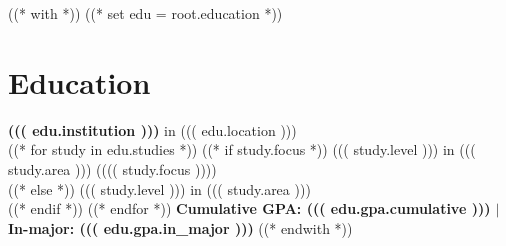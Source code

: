 ((* with *))
((* set edu = root.education *))
\section{Education}\relax
    \noindent\textbf{((( edu.institution )))} \small{in ((( edu.location )))}\\
((* for study in edu.studies *))
        ((* if study.focus *))
    ((( study.level ))) in ((( study.area ))) (((( study.focus ))))\\
        ((* else *))
    ((( study.level ))) in ((( study.area )))\\
        ((* endif *))
((* endfor *))
    \textbf{Cumulative GPA: ((( edu.gpa.cumulative ))) $|$ In-major: ((( edu.gpa.in_major )))}
((* endwith *))
